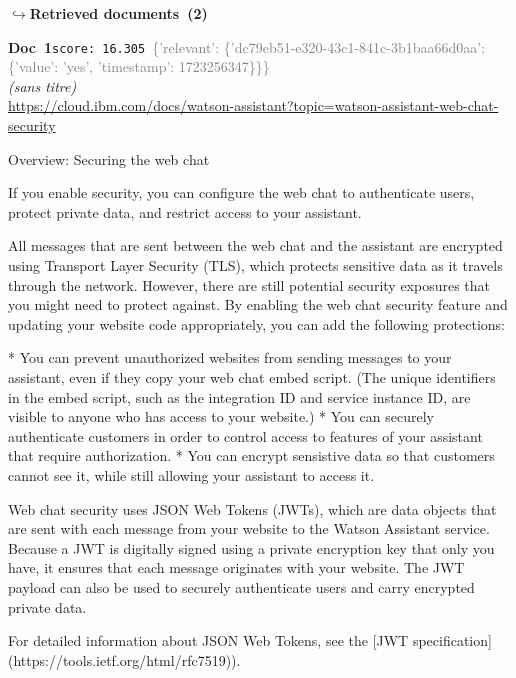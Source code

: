 \documentclass[a4paper,11pt]{article}
\begin{document}
\noindent\hfill{\footnotesize\textcolor{doccolor}{\textbf{$\hookrightarrow$\enspace Retrieved documents~(2)}}}
\begin{docenv}
{\footnotesize\textcolor{doccolor}{\textbf{Doc~1}}}\hfill{\tiny\texttt{score:~16.305}}\ {\tiny\textcolor{gray}{\{'relevant': \{'dc79eb51-e320-43c1-841c-3b1baa66d0aa': \{'value': 'yes', 'timestamp': 1723256347\}\}\}}}\\[3pt]
{\small\textit{(sans titre)}}\\[2pt]
{\tiny\url{https://cloud.ibm.com/docs/watson-assistant?topic=watson-assistant-web-chat-security}}\\[4pt]
{\footnotesize 
Overview: Securing the web chat 

If you enable security, you can configure the web chat to authenticate users, protect private data, and restrict access to your assistant.

All messages that are sent between the web chat and the assistant are encrypted using Transport Layer Security (TLS), which protects sensitive data as it travels through the network. However, there are still potential security exposures that you might need to protect against. By enabling the web chat security feature and updating your website code appropriately, you can add the following protections:



* You can prevent unauthorized websites from sending messages to your assistant, even if they copy your web chat embed script. (The unique identifiers in the embed script, such as the integration ID and service instance ID, are visible to anyone who has access to your website.)
* You can securely authenticate customers in order to control access to features of your assistant that require authorization.
* You can encrypt sensistive data so that customers cannot see it, while still allowing your assistant to access it.



Web chat security uses JSON Web Tokens (JWTs), which are data objects that are sent with each message from your website to the Watson Assistant service. Because a JWT is digitally signed using a private encryption key that only you have, it ensures that each message originates with your website. The JWT payload can also be used to securely authenticate users and carry encrypted private data.

For detailed information about JSON Web Tokens, see the [JWT specification](https://tools.ietf.org/html/rfc7519)).

}
\end{docenv}
\end{document}
